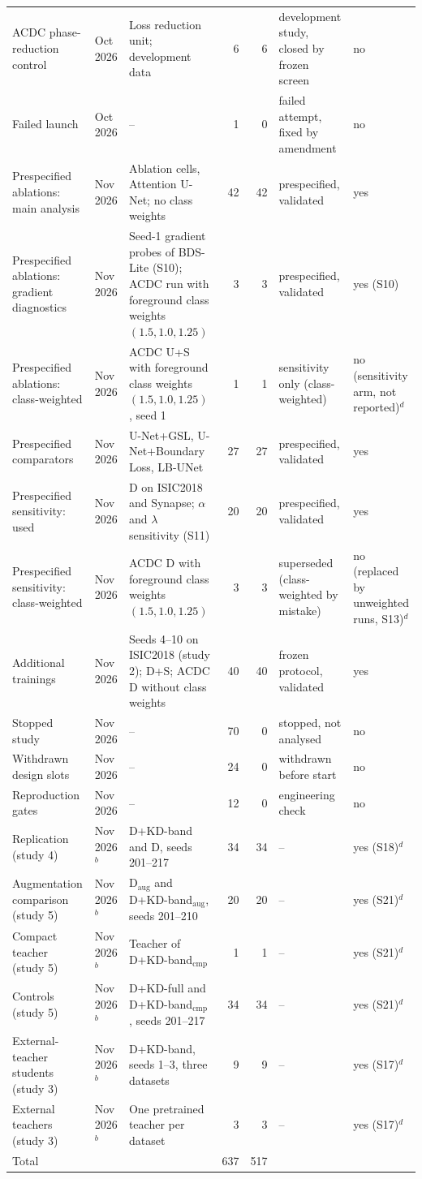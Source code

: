 \begin{longtable}{@{}p{3.0cm}p{1.5cm}p{3.6cm}rrp{2.8cm}p{2.3cm}@{}}
ACDC phase-reduction control & Oct 2026 & Loss reduction unit; development data & 6 & 6 & development study, closed by frozen screen & no \\
Failed launch & Oct 2026 & -- & 1 & 0 & failed attempt, fixed by amendment & no \\
Prespecified ablations: main analysis & Nov 2026 & Ablation cells, Attention U-Net; no class weights & 42 & 42 & prespecified, validated & yes \\
Prespecified ablations: gradient diagnostics & Nov 2026 & Seed-1 gradient probes of BDS-Lite (S10); ACDC run with foreground class weights $(1.5,1.0,1.25)$ & 3 & 3 & prespecified, validated & yes (S10) \\
Prespecified ablations: class-weighted & Nov 2026 & ACDC U+S with foreground class weights $(1.5,1.0,1.25)$, seed 1 & 1 & 1 & sensitivity only (class-weighted) & no (sensitivity arm, not reported)$^{d}$ \\
Prespecified comparators & Nov 2026 & U-Net+GSL, U-Net+Boundary Loss, LB-UNet & 27 & 27 & prespecified, validated & yes \\
Prespecified sensitivity: used & Nov 2026 & D on ISIC2018 and Synapse; $\alpha$ and $\lambda$ sensitivity (S11) & 20 & 20 & prespecified, validated & yes \\
Prespecified sensitivity: class-weighted & Nov 2026 & ACDC D with foreground class weights $(1.5,1.0,1.25)$ & 3 & 3 & superseded (class-weighted by mistake) & no (replaced by unweighted runs, S13)$^{d}$ \\
Additional trainings & Nov 2026 & Seeds 4--10 on ISIC2018 (study 2); D+S; ACDC D without class weights & 40 & 40 & frozen protocol, validated & yes \\
Stopped study & Nov 2026 & -- & 70 & 0 & stopped, not analysed & no \\
Withdrawn design slots & Nov 2026 & -- & 24 & 0 & withdrawn before start & no \\
Reproduction gates & Nov 2026 & -- & 12 & 0 & engineering check & no \\
Replication (study 4) & Nov 2026$^{b}$ & D+KD-band and D, seeds 201--217 & 34 & 34 & -- & yes (S18)$^{d}$ \\
Augmentation comparison (study 5) & Nov 2026$^{b}$ & D$_{\mathrm{aug}}$ and D+KD-band$_{\mathrm{aug}}$, seeds 201--210 & 20 & 20 & -- & yes (S21)$^{d}$ \\
Compact teacher (study 5) & Nov 2026$^{b}$ & Teacher of D+KD-band$_{\mathrm{cmp}}$ & 1 & 1 & -- & yes (S21)$^{d}$ \\
Controls (study 5) & Nov 2026$^{b}$ & D+KD-full and D+KD-band$_{\mathrm{cmp}}$, seeds 201--217 & 34 & 34 & -- & yes (S21)$^{d}$ \\
External-teacher students (study 3) & Nov 2026$^{b}$ & D+KD-band, seeds 1--3, three datasets & 9 & 9 & -- & yes (S17)$^{d}$ \\
External teachers (study 3) & Nov 2026$^{b}$ & One pretrained teacher per dataset & 3 & 3 & -- & yes (S17)$^{d}$ \\
\midrule
Total & & & 637 & 517 & & \\
\bottomrule
\end{longtable}
